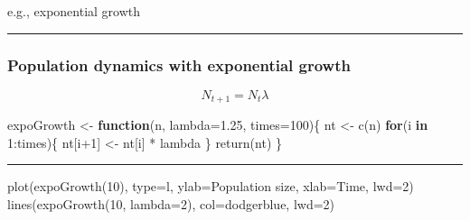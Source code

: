 \documentclass[
]{article}
\newenvironment{Shaded}{\begin{snugshade}}{\end{snugshade}}
\newcommand{\AttributeTok}[1]{\textcolor[rgb]{0.77,0.63,0.00}{#1}}
\newcommand{\ControlFlowTok}[1]{\textcolor[rgb]{0.13,0.29,0.53}{\textbf{#1}}}
\newcommand{\DecValTok}[1]{\textcolor[rgb]{0.00,0.00,0.81}{#1}}
\newcommand{\FloatTok}[1]{\textcolor[rgb]{0.00,0.00,0.81}{#1}}
\newcommand{\FunctionTok}[1]{\textcolor[rgb]{0.00,0.00,0.00}{#1}}
\newcommand{\NormalTok}[1]{#1}
\newcommand{\OtherTok}[1]{\textcolor[rgb]{0.56,0.35,0.01}{#1}}
\newcommand{\SpecialCharTok}[1]{\textcolor[rgb]{0.00,0.00,0.00}{#1}}
\newcommand{\StringTok}[1]{\textcolor[rgb]{0.31,0.60,0.02}{#1}}
\begin{document}
e.g., exponential growth

\begin{center}\rule{0.5\linewidth}{0.5pt}\end{center}

\hypertarget{population-dynamics-with-exponential-growth}{%
\subsubsection{Population dynamics with exponential
growth}\label{population-dynamics-with-exponential-growth}}

\[ N_{t+1} = N_t \lambda \]

\begin{Shaded}
\begin{Highlighting}[]
\NormalTok{expoGrowth }\OtherTok{\textless{}{-}} \ControlFlowTok{function}\NormalTok{(n, }\AttributeTok{lambda=}\FloatTok{1.25}\NormalTok{, }\AttributeTok{times=}\DecValTok{100}\NormalTok{)\{}
\NormalTok{  nt }\OtherTok{\textless{}{-}} \FunctionTok{c}\NormalTok{(n)}
  \ControlFlowTok{for}\NormalTok{(i }\ControlFlowTok{in} \DecValTok{1}\SpecialCharTok{:}\NormalTok{times)\{}
\NormalTok{    nt[i}\SpecialCharTok{+}\DecValTok{1}\NormalTok{] }\OtherTok{\textless{}{-}}\NormalTok{ nt[i] }\SpecialCharTok{*}\NormalTok{ lambda}
\NormalTok{  \}}
  \FunctionTok{return}\NormalTok{(nt)}
\NormalTok{\}}
\end{Highlighting}
\end{Shaded}

\begin{center}\rule{0.5\linewidth}{0.5pt}\end{center}

\begin{Shaded}
\begin{Highlighting}[]
\FunctionTok{plot}\NormalTok{(}\FunctionTok{expoGrowth}\NormalTok{(}\DecValTok{10}\NormalTok{), }\AttributeTok{type=}\StringTok{\textquotesingle{}l\textquotesingle{}}\NormalTok{, }\AttributeTok{ylab=}\StringTok{\textquotesingle{}Population size\textquotesingle{}}\NormalTok{, }
  \AttributeTok{xlab=}\StringTok{\textquotesingle{}Time\textquotesingle{}}\NormalTok{, }\AttributeTok{lwd=}\DecValTok{2}\NormalTok{)}
\FunctionTok{lines}\NormalTok{(}\FunctionTok{expoGrowth}\NormalTok{(}\DecValTok{10}\NormalTok{, }\AttributeTok{lambda=}\DecValTok{2}\NormalTok{), }\AttributeTok{col=}\StringTok{\textquotesingle{}dodgerblue\textquotesingle{}}\NormalTok{, }\AttributeTok{lwd=}\DecValTok{2}\NormalTok{)}
\end{Highlighting}
\end{Shaded}
\end{document}
